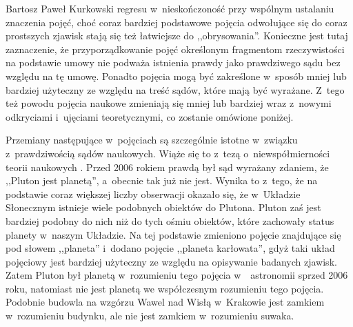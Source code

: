 \begin{artplenv}{Bartosz Paweł Kurkowski}
regresu w~nieskończoność przy wspólnym ustalaniu znaczenia pojęć, choć coraz bardziej podstawowe pojęcia
odwołujące się do coraz
prostszych zjawisk stają się też łatwiejsze do ,,obrysowania''. Konieczne jest tutaj zaznaczenie, że przyporządkowanie
pojęć określonym fragmentom rzeczywistości na podstawie umowy nie podważa istnienia prawdy jako prawdziwego sądu
\parencite[s.~145]{grobler_prawda_2000}
bez względu na tę umowę. Ponadto pojęcia mogą być zakreślone w~sposób
mniej lub bardziej użyteczny ze względu na treść sądów, które mają być wyrażane. Z~tego też powodu pojęcia naukowe
zmieniają się mniej lub bardziej wraz z~nowymi odkryciami i~ujęciami teoretycznymi, co zostanie omówione poniżej.


Przemiany następujące w~pojęciach są szczególnie istotne w~związku z~prawdziwością sądów naukowych. Wiąże się to z~tezą
o~niewspółmierności teorii naukowych
\parencite[s.~88]{grobler_metodologia_2006}.
Przed 2006 rokiem prawdą był sąd
wyrażany zdaniem, że ,,Pluton jest planetą'', a~obecnie tak już nie jest. Wynika to z~tego, że na podstawie coraz
większej liczby obserwacji okazało się, że w~Układzie Słonecznym istnieje wiele podobnych obiektów do Plutona. Pluton
zaś jest bardziej podobny do nich niż do tych ośmiu obiektów, które zachowały status planety w~naszym Układzie. Na tej
podstawie zmieniono pojęcie znajdujące się pod słowem ,,planeta'' i~dodano pojęcie ,,planeta karłowata'', gdyż taki układ
pojęciowy jest bardziej użyteczny ze względu na opisywanie badanych zjawisk. Zatem Pluton był planetą w~rozumieniu tego
pojęcia w~~astronomii sprzed 2006 roku, natomiast nie jest planetą we współczesnym rozumieniu tego pojęcia. Podobnie
budowla na wzgórzu Wawel nad Wisłą w~Krakowie jest zamkiem w~rozumieniu budynku, ale nie jest zamkiem w~rozumieniu
suwaka.



\end{artplenv}
